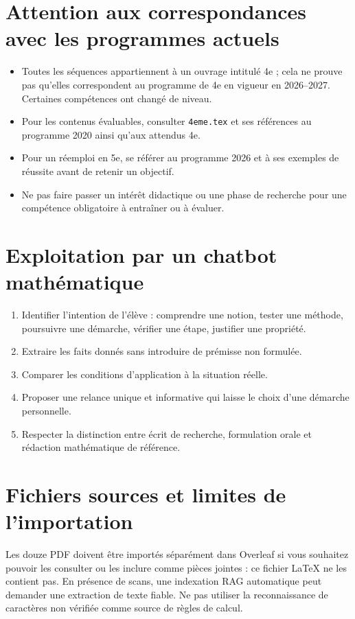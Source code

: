 \documentclass[11pt,a4paper]{article}
\begin{document}
\section{Attention aux correspondances avec les programmes actuels}
\begin{itemize}\item Toutes les séquences appartiennent à un ouvrage intitulé 4e ; cela ne prouve pas qu’elles correspondent au programme de 4e en vigueur en 2026--2027. Certaines compétences ont changé de niveau.\item Pour les contenus évaluables, consulter \texttt{4eme.tex} et ses références au programme 2020 ainsi qu’aux attendus 4e.\item Pour un réemploi en 5e, se référer au programme 2026 et à ses exemples de réussite avant de retenir un objectif.\item Ne pas faire passer un intérêt didactique ou une phase de recherche pour une compétence obligatoire à entraîner ou à évaluer.\end{itemize}
\section{Exploitation par un chatbot mathématique}
\begin{enumerate}\item Identifier l’intention de l’élève : comprendre une notion, tester une méthode, poursuivre une démarche, vérifier une étape, justifier une propriété.\item Extraire les faits donnés sans introduire de prémisse non formulée.\item Comparer les conditions d’application à la situation réelle.\item Proposer une relance unique et informative qui laisse le choix d’une démarche personnelle.\item Respecter la distinction entre écrit de recherche, formulation orale et rédaction mathématique de référence.\end{enumerate}
\section{Fichiers sources et limites de l’importation}
Les douze PDF doivent être importés séparément dans Overleaf si vous souhaitez pouvoir les consulter ou les inclure comme pièces jointes : ce fichier LaTeX ne les contient pas. En présence de scans, une indexation RAG automatique peut demander une extraction de texte fiable. Ne pas utiliser la reconnaissance de caractères non vérifiée comme source de règles de calcul.\par
\end{document}

